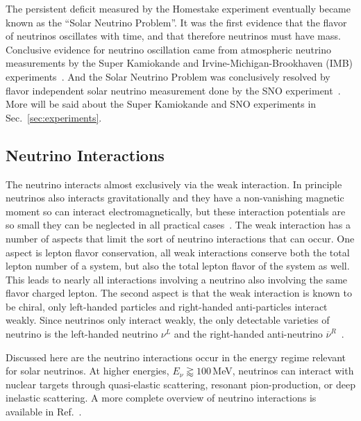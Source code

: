 The persistent deficit measured by the Homestake experiment
eventually became known as the ``Solar Neutrino Problem''.
It was the first evidence that the flavor of neutrinos oscillates with
time, and that therefore neutrinos must have mass.
Conclusive evidence for neutrino oscillation came from  atmospheric neutrino
measurements by the Super Kamiokande and Irvine-Michigan-Brookhaven (IMB)
experiments~\cite{superk_atmospherics, imb_atmospherics}.
And the Solar Neutrino Problem was conclusively resolved by flavor
independent solar neutrino measurement done
by the SNO experiment~\cite{sno_first, sno_second}.
More will be said about the Super Kamiokande and SNO experiments in
Sec.~\ref{sec:experiments}.

\subsection{Neutrino Interactions}
\label{sec:neutrino_interactions}
The neutrino interacts almost exclusively via the weak interaction.
In principle neutrinos also interacts gravitationally and they have a non-vanishing
magnetic moment so can interact electromagnetically, but these
interaction potentials are so small they can be neglected in all practical
cases~\cite{neutrino_magmom}.
The weak interaction has a number of aspects that limit the sort of neutrino
interactions that can occur. One aspect is lepton flavor conservation,
all weak interactions conserve both the total lepton number of a system, but also
the total lepton flavor of the system as well.
This leads to nearly all interactions involving a neutrino also involving the
same flavor charged lepton.
The second aspect is that the weak interaction is known to be chiral,
only left-handed particles and right-handed anti-particles interact weakly.
Since neutrinos only interact weakly, the only detectable varieties of neutrino
is the left-handed neutrino $\nu^{L}$  and the right-handed
anti-neutrino $\overline{\nu}^{R}$~\cite{weinberg}.

Discussed here are the neutrino interactions occur in the energy regime
relevant for solar neutrinos.
At higher energies, $E_{\nu} \gtrapprox 100$\,MeV, neutrinos can interact
with nuclear targets through quasi-elastic scattering, resonant
pion-production, or deep inelastic scattering.
A more complete overview of neutrino interactions is available in Ref.~\cite{neutrino_xsec}.

